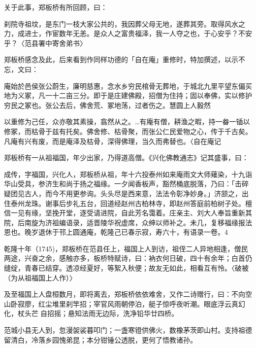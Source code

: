 关于此事，郑板桥有所回顾，曰：

\begin{BookQuote}
刹院寺祖坟，是东门一枝大家公共的，我因葬父母无地，遂葬其旁。取得风水之力，成进士，作宦数年无恙。是众人之富贵福泽，我一人夺之也，于心安乎？不安乎？〈范县署中寄舍弟书〉
\end{BookQuote}

郑板桥感念及此，后来看到作同样功德的「自在庵」重修时，特加撰述，以示不忘，文曰：

\begin{BookQuote}
庵始於邑侯张公蔚生，廉明慈惠，念水乡穷民棺骨无葬地，于城北九里平望东偏买地为义冢，凡一十二亩三分。即于是庄建佛殿，招僧为住持；固以奉佛，实以修护穷民之冢也。张公去后，佛舍荒、冢地荡，过者伤之。慧圆上人毅然
\end{BookQuote}

\vfill
\begin{BookNotes}
\end{BookNotes}

以重修为己任，众亦敬其素操，翕然从之。…有庵有僧，耕渔之暇，持一畚一锸以修冢，而枯骨于兹有托矣。佛舍修、枯骨聚，而张公仁民爱物之心，传于千古矣。凡庵有兴有废，而是庵泽及枯骨，深得佛理，当久而弗替也。〈自在庵记

郑板桥有一从祖福国，年少出家，乃得道高僧。《兴化佛教通志》记其盛事，曰：

成传，字福国，兴化人，郑板桥从祖，年十六投泰州如来庵雨文大师薙染，十九诣华山受具，参济生和尚于扬之福缘。一夕闻香板声，豁然桶底脱落，乃曰：「击碎疑团见古人，而今不用更参询。头头尽是西来意，法法令彰净妙身。」济颔之，出住泰州龙珠。谢事后步礼五台，回道经赵州古柏林寺，即赵州答庭前柏树子处。檀信一见有缘，坚挽开堂，逐受请进院，自此芳名霭着。庄亲主、刘大人奉旨重新其院，后南旋为济祖编语录，适晋陵华祝虚席，众绅以师补之。未几，复移福缘报法恩也。晚岁退休于邗上圆通庵，乾隆己已春示寂，寿六十，有语录一卷。4

乾隆十年（1745)，郑板桥在范县任上，福国上人到访，祖侄二人异地相逢，僧民两途，兴奋之余，感触亦多，板桥特赋诗，曰：衲衣何日破，四十有余年；白首仍缝绽，青春已结穿。透凉经夏好，等絮入秋便；故友无如此，相看互有怜。〈破被（为从祖福国上人作）〉

及至福国上人盘桓数月，即将离去，郑板桥依依难舍，又作二诗赠行，曰：不向空山卧寂廖，红尘堆里刹竿招；宰官风雨朝停泊，艇子惊呼夜听潮。眼底浮云真幻化，杖头芒𪨗自招摇；悬知法雨无边际，洗净铅华廿四桥。

范城小县无人到，忽漫袈裟暮叩门；一盏寒镫供佛火，数橡茅茨即山村。支持祖德留清白，冷落乡园愧弟昆；本分钳锤公透脱，更何了悟教诸孙。

